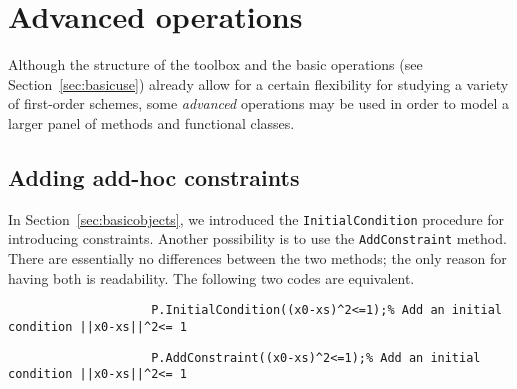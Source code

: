 \documentclass[11pt,a4paper]{article}
\begin{document}
					\section{Advanced operations}		%
					
					Although the structure of the toolbox and the basic operations (see Section~\ref{sec:basicuse}) already allow for a certain flexibility for studying a variety of first-order schemes, some \emph{advanced} operations may be used in order to model a larger panel of methods and functional classes.
					
					\subsection{Adding add-hoc constraints}\label{sec:constraints}
					In Section~\ref{sec:basicobjects}, we introduced the \verb?InitialCondition? procedure for introducing constraints. Another possibility is to use the \verb?AddConstraint? method. There are essentially no differences between the two methods; the only reason for having both is readability. The following two codes are equivalent.\\[-1cm]
					\begin{lstlisting}
					P.InitialCondition((x0-xs)^2<=1);% Add an initial condition ||x0-xs||^2<= 1
					\end{lstlisting}\vspace{-.5cm}
					\begin{lstlisting}
					P.AddConstraint((x0-xs)^2<=1);% Add an initial condition ||x0-xs||^2<= 1
					\end{lstlisting}
					
\end{document}
